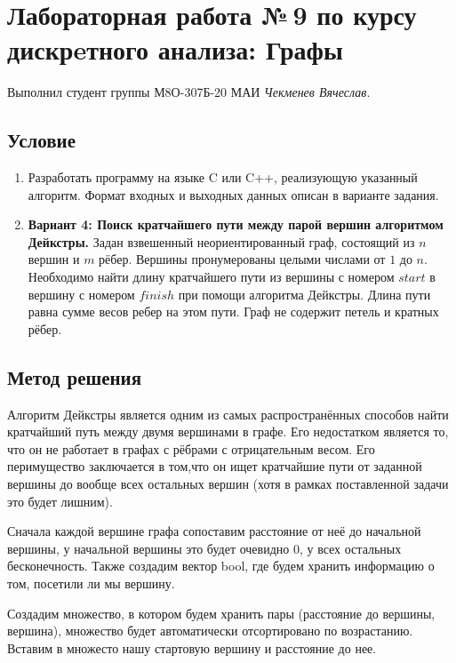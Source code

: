 \documentclass[12pt]{article}
\begin{document}
    \section*{Лабораторная работа №\,9 по курсу дискрeтного анализа: 
    Графы}

    Выполнил студент группы М8О-307Б-20 МАИ \textit{Чекменев Вячеслав}.

    \subsection*{Условие}
 
    \begin{enumerate}
    \item Разработать программу на языке C или C++, реализующую указанный
    алгоритм. Формат входных и выходных данных описан в варианте задания.
    \item \textbf{Вариант 4: Поиск кратчайшего пути между парой вершин
    алгоритмом Дейкстры.} Задан взвешенный неориентированный граф, состоящий 
    из $n$ вершин и $m$ рёбер. Вершины пронумерованы целыми числами от $1$ до 
    $n$. Необходимо найти длину кратчайшего пути из вершины с номером $start$ в 
    вершину с номером $finish$ при помощи алгоритма Дейкстры. Длина пути равна
    сумме весов ребер на этом пути. Граф не содержит петель и кратных рёбер.
    \end{enumerate}

    \subsection*{Метод решения}

    Алгоритм Дейкстры является одним из самых распространённых способов найти 
    кратчайший путь между двумя вершинами в графе. Его недостатком является то, 
    что он не работает в графах с рёбрами с отрицательным весом. Его 
    перимущество заключается в том,что он ищет кратчайшие пути от заданной 
    вершины до вообще всех остальных вершин (хотя в рамках поставленной задачи
    это будет лишним).

    Сначала каждой вершине графа сопоставим расстояние от неё до начальной вершины, у начальной вершины это 
    будет очевидно $0$, у всех остальных бесконечность. Также создадим вектор bool, где будем хранить информацию о том, посетили ли мы вершину.

    Создадим множество, в котором будем хранить пары (расстояние до вершины, вершина), множество будет автоматически отсортировано по возрастанию. Вставим в множесто нашу стартовую вершину и расстояние до нее.
\end{document}
